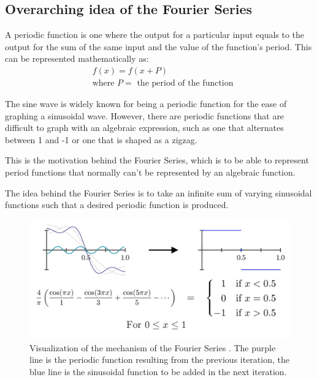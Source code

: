 \documentclass[letterpaper, 12pt]{article}
\begin{document}
\subsection{Overarching idea of the Fourier Series} \label{sec:overarchingIdea}

A periodic function is one where the output for a particular input equals to
the output for the sum of the same input and the value of the function's period.
This can be represented mathematically as:
\begin{align*}
     & f(x) = f(x + P)
    \\
     & \text{where } P = \text{ the period of the function}
\end{align*}

The sine wave is widely known for being a periodic function for the ease of graphing
a sinusoidal wave. However, there are periodic functions that are difficult to
graph with an algebraic expression, such as one that alternates between
1 and -1 or one that is shaped as a zigzag.

This is the motivation behind the Fourier Series, which is to be able to represent
period functions that normally can't be represented by an algebraic function.

The idea behind the Fourier Series is to take an infinite sum of varying sinusoidal
functions such that a desired periodic function is produced.

\begin{figure}[H]
    \centering
    \includegraphics[width=\textwidth]{fourier_basic_visual.png}
    \caption{Visualization of the mechanism of the Fourier Series \protect\cite{sandersonWhatFourierSeries2019}. The purple line is the periodic function resulting from the previous iteration, the blue line is the sinusoidal function to be added in the next iteration.}
    \label{fig:fourier_visual}
\end{figure}
\end{document}
